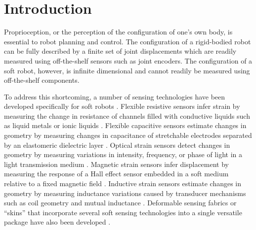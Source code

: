 \section{Introduction}  \label{sec:introduction}

Proprioception, or the perception of the configuration of one's own body, is essential to robot planning and control.
The configuration of a rigid-bodied robot can be fully described by a finite set of joint displacements which are readily measured using off-the-shelf sensors such as joint encoders.
The configuration of a soft robot, however, is infinite dimensional and cannot readily be measured using off-the-shelf components.

To address this shortcoming, a number of sensing technologies have been developed specifically for soft robots \cite{wang2018toward}.
Flexible resistive sensors infer strain by measuring the change in resistance of channels filled with conductive liquids such as liquid metals \cite{park2012design, muth2014embedded} or ionic liquids \cite{helps2018proprioceptive}.
Flexible capacitive sensors estimate changes in geometry by measuring changes in capacitance of stretchable electrodes separated by an elastomeric dielectric layer \cite{yuen2018_strain}.
Optical strain sensors detect changes in geometry by measuring variations in intensity, frequency, or phase of light in a light transmission medium \cite{galloway2019_fiberopt, ZHUANG20187, zhao2016helping, van2018soft}.
Magnetic strain sensors infer displacement by measuring the response of a Hall effect sensor embedded in a soft medium relative to a fixed magnetic field \cite{luo2017_magnet, ozel2015precise}.
Inductive strain sensors estimate changes in geometry by measuring inductance variations caused by transducer mechanisms such as coil geometry and mutual inductance \cite{felt2015contraction, lazarus2018bubble, felt2019inductance}.
Deformable sensing fabrics or ``skins'' that incorporate several soft sensing technologies into a single versatile package have also been developed \cite{case2018_fabrics, Yuen2017_fabric}.

